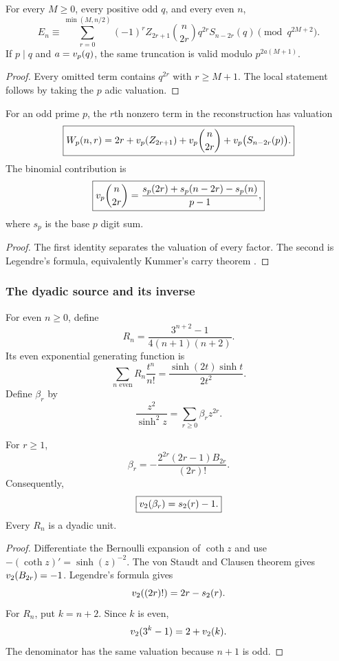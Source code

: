 \begin{histcorollary}\label{hist:cor:odd_modulus_truncation}
For every \(M\geq0\), every positive odd \(q\), and every even \(n\),
\[
\boxed{
E_n
\equiv
\sum_{r=0}^{\min(M,n/2)}
(-1)^rZ_{2r+1}
\binom n{2r}q^{2r}S_{n-2r}(q)
\pmod {q^{2M+2}}.
}
\]
If \(p\mid q\) and \(a=v_p(q)\), the same truncation is valid modulo \(p^{2a(M+1)}\).
\end{histcorollary}

\begin{proof}
Every omitted term contains \(q^{2r}\) with \(r\geq M+1\). The local statement follows by taking the \(p\) adic valuation.
\end{proof}

\begin{histproposition}\label{hist:prop:odd_row_weight}
For an odd prime \(p\), the \(r\)th nonzero term in the reconstruction has valuation
\[
\boxed{
W_p(n,r)
=
2r+v_p(Z_{2r+1})
+v_p\binom n{2r}
+v_p\bigl(S_{n-2r}(p)\bigr).
}
\]
The binomial contribution is
\[
\boxed{
v_p\binom n{2r}
=
\frac{s_p(2r)+s_p(n-2r)-s_p(n)}{p-1},
}
\]
where \(s_p\) is the base \(p\) digit sum.
\end{histproposition}

\begin{proof}
The first identity separates the valuation of every factor. The second is Legendre's formula, equivalently Kummer's carry theorem \cite{IrelandRosen1990}.
\end{proof}

\subsubsection{The dyadic source and its inverse}

For even \(n\geq0\), define
\[
\boxed{
R_n
=
\frac{3^{n+2}-1}{4(n+1)(n+2)}.
}
\]
Its even exponential generating function is
\[
\boxed{
\sum_{n\text{ even}}R_n\frac{t^n}{n!}
=
\frac{\sinh(2t)\sinh t}{2t^2}.
}
\]
Define \(\beta_r\) by
\[
\boxed{
\frac{z^2}{\sinh^2z}
=
\sum_{r\geq0}\beta_rz^{2r}.
}
\]

\begin{histproposition}\label{hist:prop:dyadic_beta_unified}
For \(r\geq1\),
\[
\boxed{
\beta_r
=
-
\frac{2^{2r}(2r-1)B_{2r}}{(2r)!}.
}
\]
Consequently,
\[
\boxed{
v_2(\beta_r)=s_2(r)-1.
}
\]
Every \(R_n\) is a dyadic unit.
\end{histproposition}

\begin{proof}
Differentiate the Bernoulli expansion of \(\coth z\) and use \(-(\coth z)'=\sinh(z)^{-2}\). The von Staudt and Clausen theorem gives \(v_2(B_{2r})=-1\). Legendre's formula gives
\[
v_2((2r)!)=2r-s_2(r).
\]
For \(R_n\), put \(k=n+2\). Since \(k\) is even,
\[
v_2(3^k-1)=2+v_2(k).
\]
The denominator has the same valuation because \(n+1\) is odd.
\end{proof}

